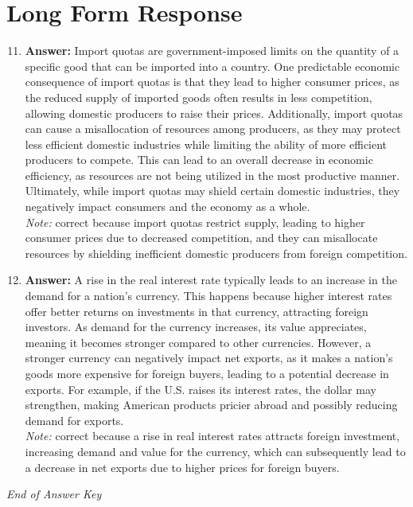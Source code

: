 \documentclass[12pt]{article}
\begin{document}
\section*{Long Form Response}
\begin{enumerate}[label=\arabic*.]
\setcounter{enumi}{10}
\item \textbf{Answer:} Import quotas are government-imposed limits on the quantity of a specific good that can be imported into a country. One predictable economic consequence of import quotas is that they lead to higher consumer prices, as the reduced supply of imported goods often results in less competition, allowing domestic producers to raise their prices. Additionally, import quotas can cause a misallocation of resources among producers, as they may protect less efficient domestic industries while limiting the ability of more efficient producers to compete. This can lead to an overall decrease in economic efficiency, as resources are not being utilized in the most productive manner. Ultimately, while import quotas may shield certain domestic industries, they negatively impact consumers and the economy as a whole.
\\ \textit{Note:} correct because import quotas restrict supply, leading to higher consumer prices due to decreased competition, and they can misallocate resources by shielding inefficient domestic producers from foreign competition.
\item \textbf{Answer:} A rise in the real interest rate typically leads to an increase in the demand for a nation's currency. This happens because higher interest rates offer better returns on investments in that currency, attracting foreign investors. As demand for the currency increases, its value appreciates, meaning it becomes stronger compared to other currencies. However, a stronger currency can negatively impact net exports, as it makes a nation's goods more expensive for foreign buyers, leading to a potential decrease in exports. For example, if the U.S. raises its interest rates, the dollar may strengthen, making American products pricier abroad and possibly reducing demand for exports.
\\ \textit{Note:} correct because a rise in real interest rates attracts foreign investment, increasing demand and value for the currency, which can subsequently lead to a decrease in net exports due to higher prices for foreign buyers.
\end{enumerate}

\vfill
\noindent\textit{End of Answer Key}
\end{document}
